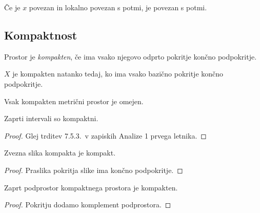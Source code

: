 \begin{posledica}
Če je $x$ povezan in lokalno povezan s potmi, je povezan s potmi.
\end{posledica}

\newpage

\subsection{Kompaktnost}

\begin{okvir}
\begin{definicija}
Prostor je \emph{kompakten},
če ima vsako njegovo odprto pokritje končno podpokritje.
\end{definicija}
\end{okvir}

\begin{trditev}
$X$ je kompakten natanko tedaj, ko ima vsako bazično pokritje
končno podpokritje.
\end{trditev}

\obvs

\begin{izrek}
Vsak kompakten metrični prostor je omejen.
\end{izrek}

\obvs

\begin{izrek}
Zaprti intervali so kompaktni.
\end{izrek}

\begin{proof}
Glej trditev 7.5.3.\ v zapiskih Analize 1 prvega letnika.
\end{proof}

\begin{izrek}
Zvezna slika kompakta je kompakt.
\end{izrek}

\begin{proof}
Praslika pokritja slike ima končno podpokritje.
\end{proof}

\begin{trditev}
Zaprt podprostor kompaktnega prostora je kompakten.
\end{trditev}

\begin{proof}
Pokritju dodamo komplement podprostora.
\end{proof}


